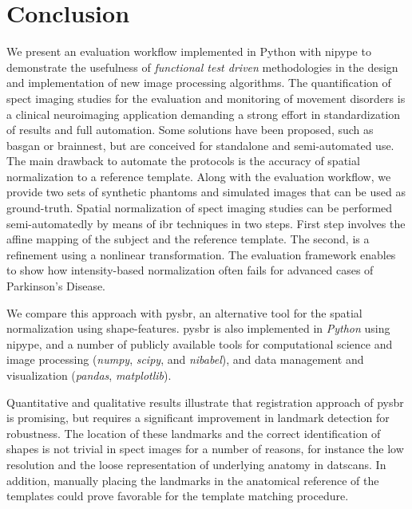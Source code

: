 \documentclass{frontiers}
\newcommand{\cbstart}{\relax}
\newcommand{\cbend}{\relax}
\begin{document}
\section{Conclusion}
\label{sec:conclusion}
\cbstart
We present an evaluation workflow implemented in Python
  with \gls*{nipype} to demonstrate the usefulness of
  \emph{functional test driven} methodologies in the design
  and implementation of new image processing algorithms.
The quantification of \gls*{spect} imaging studies
  for the evaluation and monitoring of movement disorders is
  a clinical neuroimaging application demanding a strong effort
  in standardization of results and full automation.
Some solutions have been proposed, such as \gls*{basgan} or
  \gls*{brainnest}, but are conceived for standalone and
  semi-automated use.
The main drawback to automate the protocols is the accuracy of
  spatial normalization to a reference template.
Along with the evaluation workflow, we provide two sets of
  synthetic phantoms and simulated images that can be used
  as ground-truth.
Spatial normalization of \gls*{spect} imaging studies can be
  performed semi-automatedly by means of \gls*{ibr} techniques in 
  two steps.
\cbend
First step involves the affine mapping of the subject and the
  reference template.
The second, is a refinement using a nonlinear transformation.
The evaluation framework enables to show 
  how intensity-based normalization often fails
  for advanced cases of Parkinson's Disease.

We compare this approach with \gls*{pysbr}, an alternative tool for the
  spatial normalization using shape-features.
\Gls*{pysbr} is also implemented in \emph{Python} using
  \gls*{nipype}, and a number of publicly available tools
  for computational science and image processing
  (\emph{numpy}, \emph{scipy}, and \emph{nibabel}),
  and data management and visualization (\emph{pandas},
  \emph{matplotlib}).
  
Quantitative and qualitative results illustrate that registration approach
  of \gls*{pysbr} is promising, but requires a significant improvement
  in landmark detection for robustness.
The location of these landmarks and the correct identification of
  shapes is not trivial in \gls*{spect} images for a number of reasons,
  for instance the low resolution and the loose representation of
  underlying anatomy in \glspl*{datscan}.
In addition, manually placing the landmarks in the anatomical reference of the 
  templates could prove favorable for the template matching procedure.
 
\end{document}
